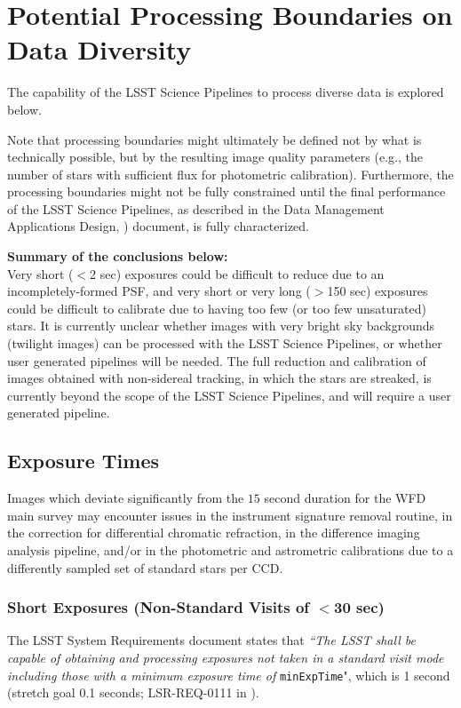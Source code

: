 \section{Potential Processing Boundaries on Data Diversity}\label{sec:procbounds}

The capability of the LSST Science Pipelines to process diverse data is explored below.

Note that processing boundaries might ultimately be defined not by what is technically possible, but by the resulting image quality parameters (e.g., the number of stars with sufficient flux for photometric calibration).
Furthermore, the processing boundaries might not be fully constrained until the final performance of the LSST Science Pipelines, as described in the Data Management Applications Design, ) document, is fully characterized.

{\bf Summary of the conclusions below:}\\
Very short ($<$2 sec) exposures could be difficult to reduce due to an incompletely-formed PSF, and very short or very long ($>$150 sec) exposures could be difficult to calibrate due to having too few (or too few unsaturated) stars.
It is currently unclear whether images with very bright sky backgrounds (twilight images) can be processed with the LSST Science Pipelines, or whether user generated pipelines will be needed.
The full reduction and calibration of images obtained with non-sidereal tracking, in which the stars are streaked, is currently beyond the scope of the LSST Science Pipelines, and will require a user generated pipeline.

\subsection{Exposure Times}\label{ssec:procbounds_expt}

Images which deviate significantly from the $15$ second duration for the WFD main survey may encounter issues in the instrument signature removal routine, in the correction for differential chromatic refraction, in the difference imaging analysis pipeline, and/or in the photometric and astrometric calibrations due to a differently sampled set of standard stars per CCD.

\subsubsection{Short Exposures (Non-Standard Visits of $<$30 sec)}
The LSST System Requirements document states that {\it ``The LSST shall be capable of obtaining and processing exposures not taken in a standard visit mode including those with a minimum exposure time of} {\tt minExpTime}", which is 1 second (stretch goal 0.1 seconds; LSR-REQ-0111 in ).

